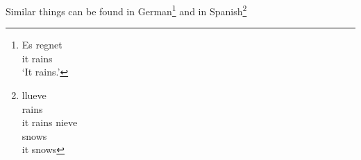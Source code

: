 Similar things can be found in German\footnote{%
\eafirst
    \gll Es regnet\\
    it rains\\
    \glt `It rains.'
  \zlast
} and in Spanish\footnote{%
\eafirst
    \ea
      \gll llueve\\
      rains\\
      \glt it rains
    \ex
      \gll nieve\\
      snows\\
      \glt it snows
    \z
  \z
}